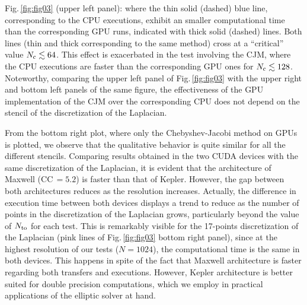 \documentclass[preprint,12pt]{elsarticle}
\begin{document}
Fig.\,\ref{fig:fig03} (upper left panel): where the thin solid
(dashed) blue line, corresponding to the CPU executions, exhibit an
smaller computational time than the corresponding GPU runs, indicated
with thick solid (dashed) lines. Both lines (thin and thick
corresponding to the same method) cross at a ``critical'' value
$N_{\rm c}\lesssim 64$. This effect is exacerbated in the test
involving the CJM, where the CPU executions are faster than the
corresponding GPU ones for $N_{\rm c}\lesssim 128$. Noteworthy,
comparing the upper left panel of Fig.\,\mbox{\ref{fig:fig03}} with
the upper right and bottom left panels of the same figure, the
effectiveness of the GPU implementation of the CJM over the
corresponding CPU does not depend on the stencil of the discretization
of the Laplacian.

From the bottom right plot, where only the Chebyshev-Jacobi method on
GPUs is plotted, we observe that the qualitative behavior is
quite similar for all the different stencils. Comparing results obtained in the two CUDA devices with
  the same discretization of the Laplacian, it is evident that the
  architecture of Maxwell (CC\,$=5.2$) is faster than that of
  Kepler. However, the gap between both architectures reduces as the
  resolution increases. Actually, the difference in execution time
  between both devices displays a trend to reduce as the number of
  points in the discretization of the Laplacian grows, particularly
  beyond the value of $N_{\rm to}$ for each test. This is remarkably
  visible for the 17-points discretization of the Laplacian (pink
  lines of Fig.\,\mbox{\ref{fig:fig03}} bottom right panel), since at
  the highest resolution of our tests ($N=1024$), the computational
  time is the same in both devices.
This happens in spite of the fact that Maxwell
architecture is faster regarding both transfers and
executions. However, Kepler architecture is better suited
  for double precision computations, which we employ in practical
  applications of the elliptic solver at hand.
\end{document}
